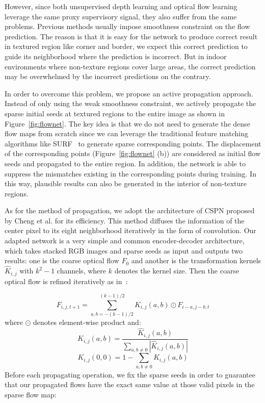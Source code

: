 \documentclass[10pt,twocolumn,letterpaper]{article}
\begin{document}
However, since both unsupervised depth learning and optical flow learning leverage the same proxy supervisory signal, they also suffer from the same problems. Previous methods usually impose smoothness constraint on the flow prediction. The reason is that it is easy for the network to produce correct result in textured region like corner and border, we expect this correct prediction to guide its neighborhood where the prediction is incorrect. But in indoor environments where non-texture regions cover large areas, the correct prediction may be overwhelmed by the incorrect predictions on the contrary.

In order to overcome this problem, we propose an active propagation approach. Instead of only using the weak smoothness constraint, we actively propagate the sparse initial seeds at textured regions to the entire image as shown in Figure~\ref{fig:flownet}. The key idea is that we do not need to generate the dense flow maps from scratch since we can leverage the traditional feature matching algorithms like SURF~\cite{bay2006surf} to generate sparse corresponding points. The displacement of the corresponding points (Figure~\ref{fig:flownet} (b)) are considered as initial flow seeds and propagated to the entire region. In addition, the network is able to suppress the mismatches existing in the corresponding points during training. In this way,  plausible results can also be generated in the interior of non-texture regions.

As for the method of propagation, we adopt the architecture of CSPN proposed by Cheng et al.\cite{cheng2018depth,cheng2018depth2} for its efficiency. This method diffuses the information of the center pixel to its eight neighborhood iteratively in the form of convolution. Our adapted network is a very simple and common encoder-decoder architecture, which takes stacked RGB images and sparse seeds as input and outputs two results: one is the coarse optical flow $F_{0}$ and another is the  transformation kernels $\hat{K}_{i,j}$ with $k^2-1$ channels, where $k$ denotes the kernel size. Then the coarse optical flow is refined iteratively as in~\cite{cheng2018depth,cheng2018depth2}:

\begin{equation}
   F_{i,j,t+1} = \sum_{a,b=-(k-1)/2}^{(k-1)/2}K_{i,j}(a,b)\odot F_{i-a,j-b,t}
\end{equation}
where $\odot$ denotes element-wise product and:
\begin{equation}
K_{i,j}(a,b) = \frac{\hat{K}_{i,j}(a,b)}{\sum_{a,b\ne 0}|\hat{K}_{i,j}(a,b)|}
\end{equation}
\begin{equation}
K_{i,j}(0,0) = 1-\sum_{a,b\ne 0}K_{i,j}(a,b)
\end{equation}
Before each propagating operation, we fix the sparse seeds in order to guarantee that our propagated flows have the exact same value at those
valid pixels in the sparse flow map:
\end{document}
